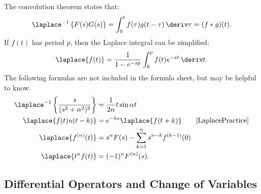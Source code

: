 \documentclass[10pt, a4paper]{article}
\begin{document}
\begin{landscape}
\begin{multicols}{2}
    The convolution theorem states that:
    \[
        \laplace^{-1} \left\{F(s) G(s)\right\}
        = \int_0^t f(\tau) g(t - \tau) \,\deriv \tau
        = (f * g)(t).
    \]
    If \(f(t)\) has period \(p\), then the Laplace integral can be simplified:
    \[
        \laplace\{f(t)\}
        = \frac{1}{1 - e^{-sp}} \int_0^p f(t) e^{-st} \,\deriv t.
    \]
    The following formulas are not included in the formula sheet, but may be helpful to know.
    \begin{align*}
        \laplace^{-1} \left\{\frac{s}{(s^2 + \alpha^2)^2}\right\} &= \frac{1}{2\alpha} t \sin \alpha t \\
        \laplace \{f(t) u(t-k)\} &= e^{-ks} \laplace\{f(t+k)\} \tag*{\cite{LaplacePractice}} \\
        \laplace \{f^{(n)}(t)\} &= s^n F(s) - \sum_{k=1}^n s^{n-k} f^{(k-1)}(0) \\
        \laplace \{t^n f(t)\} &= (-1)^n F^{(n)}(s).
    \end{align*}

\end{multicols}


\pagebreak


\begin{multicols}{2}
    \section{Differential Operators and Change of Variables}


\end{multicols}
\end{landscape}
\end{document}

